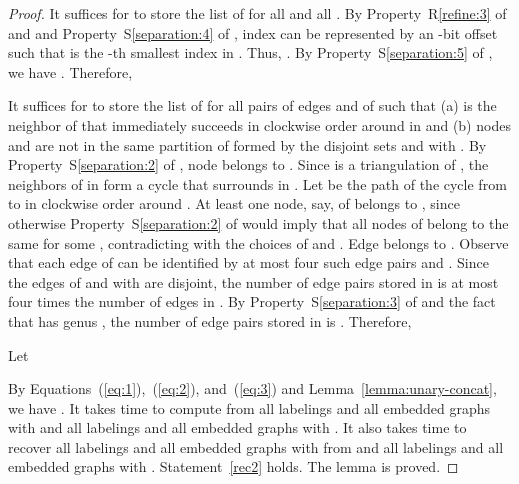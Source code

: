 \documentclass[12pt]{article}
\begin{document}
\begin{proof}
It suffices for  to store the list of
 for all  and all .  By Property~R\ref{refine:3} of  and 
and Property~S\ref{separation:4} of , index  can be
represented by an -bit offset  such that  is the
-th smallest index in .  Thus,
.
By Property~S\ref{separation:5} of , we have .  Therefore,

It suffices for  to store the list of
 for all pairs of edges
 and  of  such that (a)  is the neighbor
of  that immediately succeeds  in clockwise order around  in
 and (b) nodes  and  are not in the same partition of
 formed by the  disjoint sets  and 
with .  By Property~S\ref{separation:2} of , node
 belongs to . Since  is a triangulation
of , the neighbors of  in  form a cycle that surrounds
 in .  Let  be the path of the cycle from  to 
in clockwise order around .  At least one node, say,  of 
belongs to , since otherwise Property~S\ref{separation:2} of
 would imply that all nodes of  belong to the same 
for some , contradicting with the choices of  and .
Edge  belongs to .
Observe that each edge of  can be identified by at most
four such edge pairs  and .  Since the edges of
 and  with  are disjoint, the
number of edge pairs stored in  is at most four
times the number of edges in . By
Property~S\ref{separation:3} of  and the fact that 
has genus , the number of edge pairs stored in
 is .  Therefore,

Let 

By Equations~(\ref{eq:1}),~(\ref{eq:2}), and~(\ref{eq:3}) and
Lemma~\ref{lemma:unary-concat}, we have . It
takes  time to compute  from all labelings
 and all embedded graphs  with  and
all labelings  and all embedded graphs  with .  It also takes  time to recover all labelings
 and all embedded graphs  with  from
 and all labelings  and all embedded graphs
 with .  Statement~\ref{rec2} holds.  The lemma
is proved.
\end{proof}
\end{document}
